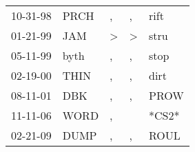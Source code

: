 \begin{supertabular}{lllll}
 10-31-98 &  PRCH &             , &             , &   rift \\
 01-21-99 &   JAM &  \textgreater &  \textgreater &   stru \\
 05-11-99 &  byth &             , &             , &   stop \\
 02-19-00 &  THIN &             , &             , &   dirt \\
 08-11-01 &   DBK &             , &             , &   PROW \\
 11-11-06 &  WORD &             , &               &  *CS2* \\
 02-21-09 &  DUMP &             , &             , &   ROUL \\
\end{supertabular}
